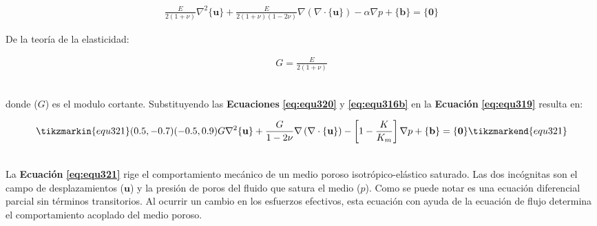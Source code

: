 \begin{ceqn} %
\begin{gather}\label{eq:equ319}
\frac{E}{2(1+\nu)}\nabla^2 \{\mathbf{u}\}
+\frac{E}{2(1+\nu)(1-2\nu)} \nabla\left( \nabla \cdot \{\mathbf{u}\}\right)
- \alpha\nabla p + \{\mathbf{b}\} = \{\mathbf{0}\} 
\end{gather}   
\end{ceqn}

De la teoría de la elasticidad:
\begin{ceqn} %
\begin{gather}\label{eq:equ320}
G=\frac{E}{2(1+\nu)}
\end{gather}   
\end{ceqn}
\\
donde ($G$) es el modulo cortante. Substituyendo las \textbf{Ecuaciones} \textbf{\ref{eq:equ320}} y \textbf{\ref{eq:equ316b}} en la \textbf{Ecuación} \textbf{\ref{eq:equ319}} resulta en:
\bigskip

\begin{ceqn} %
\begin{gather}\label{eq:equ321}
\tikzmarkin{equ321}(0.5,-0.7)(-0.5,0.9)
G\nabla^2 \{\mathbf{u}\}
+\frac{G}{1-2\nu} \nabla\left( \nabla\cdot \{\mathbf{u}\}\right)
- \left[1-\frac{K}{K_m}\right]\nabla p + \{\mathbf{b}\} = \{\mathbf{0}\}
\tikzmarkend{equ321}
\end{gather}   
\end{ceqn}
\\
La \textbf{Ecuación} \textbf{\ref{eq:equ321}} rige el comportamiento mecánico de un medio poroso isotrópico-elástico saturado. Las dos incógnitas son el campo de desplazamientos ($\mathbf{u}$) y la presión de poros del fluido que satura el medio ($p$). Como se puede notar es una ecuación diferencial parcial sin términos transitorios. Al ocurrir un cambio en los esfuerzos efectivos, esta ecuación con ayuda de la ecuación de flujo determina el comportamiento acoplado del medio poroso.\bigskip




